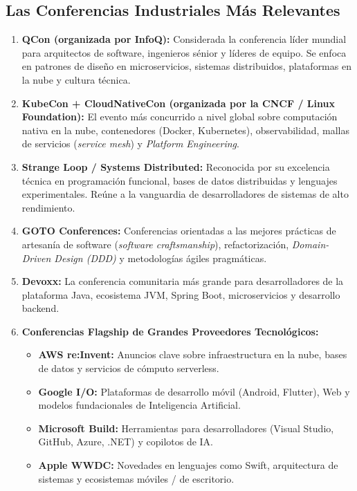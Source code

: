 \documentclass[12pt,a4paper]{article}
\begin{document}
\subsection{Las Conferencias Industriales Más Relevantes}
\begin{enumerate}[leftmargin=*]
    \item \textbf{QCon (organizada por InfoQ):}
    Considerada la conferencia líder mundial para arquitectos de software, ingenieros sénior y líderes de equipo. Se enfoca en patrones de diseño en microservicios, sistemas distribuidos, plataformas en la nube y cultura técnica.
    
    \item \textbf{KubeCon + CloudNativeCon (organizada por la CNCF / Linux Foundation):}
    El evento más concurrido a nivel global sobre computación nativa en la nube, contenedores (Docker, Kubernetes), observabilidad, mallas de servicios (\textit{service mesh}) y \textit{Platform Engineering}.
    
    \item \textbf{Strange Loop / Systems Distributed:}
    Reconocida por su excelencia técnica en programación funcional, bases de datos distribuidas y lenguajes experimentales. Reúne a la vanguardia de desarrolladores de sistemas de alto rendimiento.
    
    \item \textbf{GOTO Conferences:}
    Conferencias orientadas a las mejores prácticas de artesanía de software (\textit{software craftsmanship}), refactorización, \textit{Domain-Driven Design (DDD)} y metodologías ágiles pragmáticas.
    
    \item \textbf{Devoxx:}
    La conferencia comunitaria más grande para desarrolladores de la plataforma Java, ecosistema JVM, Spring Boot, microservicios y desarrollo backend.
    
    \item \textbf{Conferencias Flagship de Grandes Proveedores Tecnológicos:}
    \begin{itemize}
        \item \textbf{AWS re:Invent:} Anuncios clave sobre infraestructura en la nube, bases de datos y servicios de cómputo serverless.
        \item \textbf{Google I/O:} Plataformas de desarrollo móvil (Android, Flutter), Web y modelos fundacionales de Inteligencia Artificial.
        \item \textbf{Microsoft Build:} Herramientas para desarrolladores (Visual Studio, GitHub, Azure, .NET) y copilotos de IA.
        \item \textbf{Apple WWDC:} Novedades en lenguajes como Swift, arquitectura de sistemas y ecosistemas móviles / de escritorio.
    \end{itemize}
\end{enumerate}
\end{document}
